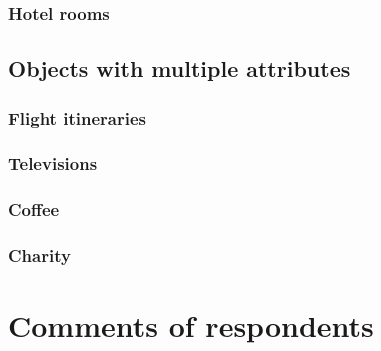 \documentclass[11pt,letter]{article}
\begin{document}


\subsubsection{Hotel rooms}



\subsection{Objects with multiple attributes}

\subsubsection{Flight itineraries}



\subsubsection{Televisions}



\subsubsection{Coffee}



\subsubsection{Charity}



\section{Comments of respondents}



\end{document}
